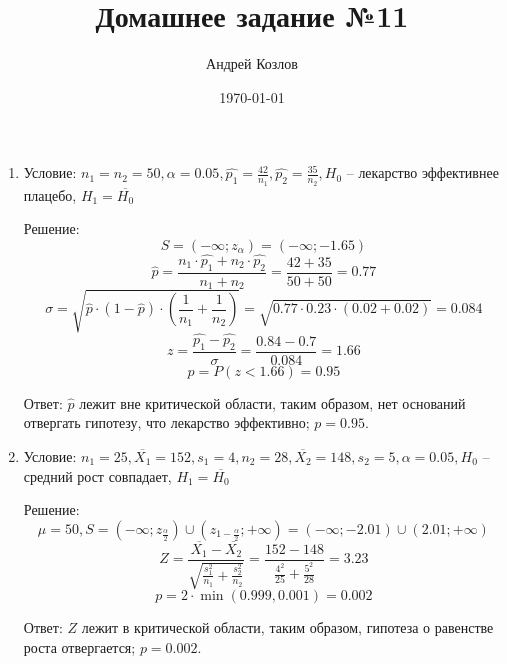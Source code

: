 \documentclass[12pt,a4paper]{article}
\begin{document}
\title{Домашнее задание №11}
\author{Андрей Козлов}
\date{\today}

\maketitle

\begin{enumerate}
	\item {
		Условие: $n_1 = n_2 = 50, \alpha = 0.05, \hat{p_1} = \frac{42}{n_1}, \hat{p_2} = \frac{35}{n_2}, H_0$ -- лекарство эффективнее плацебо, $H_1 = \overline{H_0}$

		Решение:
		$$S = \left( -\infty; z_{\alpha} \right) = \left( -\infty; -1.65 \right)$$
		$$\hat{p} = \frac{n_1 \cdot \hat{p_1} + n_2 \cdot \hat{p_2}}{n_1 + n_2} = \frac{42 + 35}{50 + 50} = 0.77$$
		$$\sigma = \sqrt{\hat{p} \cdot \left( 1 - \hat{p} \right) \cdot \left( \frac{1}{n_1} + \frac{1}{n_2} \right)} = \sqrt{0.77 \cdot 0.23 \cdot \left( 0.02 + 0.02 \right)} = 0.084$$
		$$z = \frac{\hat{p_1} - \hat{p_2}}{\sigma} = \frac{0.84 - 0.7}{0.084} = 1.66$$
		$$p = P \left(z < 1.66 \right) = 0.95$$

		Ответ: $\hat{p}$ лежит вне критической области, таким образом, нет оснований отвергать гипотезу, что лекарство эффективно; $p = 0.95$.
	}

	\item {
		Условие: $n_1 = 25, \overline{X_1} = 152, s_1 = 4, n_2 = 28, \overline{X_2} = 148, s_2 = 5, \alpha = 0.05, H_0$ -- средний рост совпадает, $H_1 = \overline{H_0}$

		Решение:
		$$\mu = 50, S = \left( -\infty; z_{\frac{\alpha}{2}} \right) \cup \left( z_{1 - \frac{\alpha}{2}}; +\infty \right) = \left( -\infty; -2.01 \right) \cup \left( 2.01; +\infty \right)$$
		$$Z = \frac{\overline{X_1} - \overline{X_2}}{\sqrt{\frac{s^2_1}{n_1} + \frac{s^2_2}{n_2}}} = \frac{152 - 148}{\frac{4^2}{25} + \frac{5^2}{28}} = 3.23$$
		$$p = 2 \cdot \min \left( 0.999, 0.001 \right) = 0.002$$

		Ответ: $Z$ лежит в критической области, таким образом, гипотеза о равенстве роста отвергается; $p = 0.002$.
	}

\end{enumerate}
\end{document}

